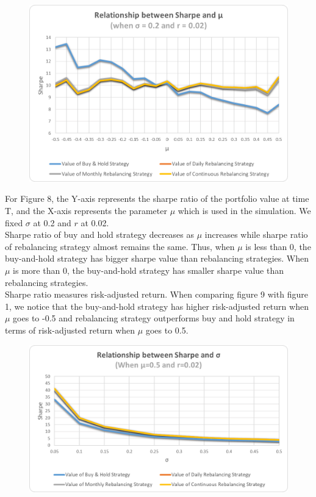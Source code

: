 \documentclass[
10pt, %
a4paper, %
oneside, %
headinclude,footinclude, %
BCOR5mm, %
]{scrartcl}
\begin{document}
\begin{figure}[H]
	\centering
	\includegraphics[width=0.7\linewidth]{sharpe_mu_020_002}
	\caption{}
	\label{fig:sharpemu020002}
\end{figure}
For Figure 8, the Y-axis represents the sharpe ratio of the portfolio value at time T, and the X-axis represents the parameter $\mu$ which is used in the simulation. We fixed $\sigma$ at 0.2 and $r$ at 0.02.\\

Sharpe ratio of buy and hold strategy decreases as $\mu$ increases while sharpe ratio of rebalancing strategy almost remains the same. Thus, when $\mu$ is less than 0, the buy-and-hold strategy has bigger sharpe value than rebalancing strategies. When $\mu$ is more than 0, the buy-and-hold strategy has smaller sharpe value than rebalancing strategies. \\

Sharpe ratio measures risk-adjusted return. When comparing figure 9 with figure 1, we notice that the buy-and-hold strategy has higher risk-adjusted return when $\mu$ goes to -0.5 and rebalancing strategy outperforms buy and hold strategy in terms of risk-adjusted return when $\mu$ goes to 0.5.


\begin{figure}[H]
	\centering
	\includegraphics[width=0.7\linewidth]{sharpe_sigma_050_002}
	\caption{}
	\label{fig:sharpesigma050002}
\end{figure}
\end{document}
